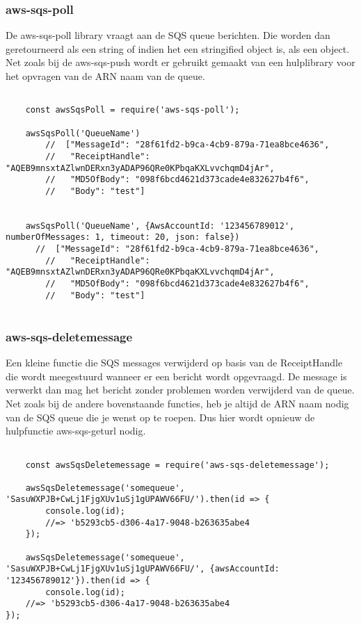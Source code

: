 \subsubsection{aws-sqs-poll}
De aws-sqs-poll library vraagt aan de SQS queue berichten. Die worden dan geretourneerd als een string of indien het een stringified object is, als een object. Net zoals bij de aws-sqs-push wordt er gebruikt gemaakt van een hulplibrary voor het opvragen van de ARN naam van de queue.

\begin{lstlisting}[caption=Voorbeeld hoe berichten worden opgehaald van de SQS queue]

	const awsSqsPoll = require('aws-sqs-poll');

	awsSqsPoll('QueueName')
    	//  ["MessageId": "28f61fd2-b9ca-4cb9-879a-71ea8bce4636",
    	//   "ReceiptHandle": "AQEB9mnsxtAZlwnDERxn3yADAP96QRe0KPbqaKXLvvchqmD4jAr",
    	//   "MD5OfBody": "098f6bcd4621d373cade4e832627b4f6",
    	//   "Body": "test"]


	awsSqsPoll('QueueName', {AwsAccountId: '123456789012', numberOfMessages: 1, timeout: 20, json: false})
  	  //  ["MessageId": "28f61fd2-b9ca-4cb9-879a-71ea8bce4636",
    	//   "ReceiptHandle": "AQEB9mnsxtAZlwnDERxn3yADAP96QRe0KPbqaKXLvvchqmD4jAr",
    	//   "MD5OfBody": "098f6bcd4621d373cade4e832627b4f6",
    	//   "Body": "test"]
	
\end{lstlisting}

\subsubsection{aws-sqs-deletemessage}
Een kleine functie die SQS messages verwijderd op basis van de ReceiptHandle die wordt meegestuurd wanneer er een bericht wordt opgevraagd. De message is verwerkt dan mag het bericht zonder problemen worden verwijderd van de queue. Net zoals bij de andere bovenstaande functies, heb je altijd de ARN naam nodig van de SQS queue die je wenst op te roepen. Dus hier wordt opnieuw de hulpfunctie aws-sqs-geturl nodig.

\begin{lstlisting}[caption=Voorbeeld hoe een bericht wordt verwijderd van SQS nadat het is verwerkt]

	const awsSqsDeletemessage = require('aws-sqs-deletemessage');

	awsSqsDeletemessage('somequeue', 'SasuWXPJB+CwLj1FjgXUv1uSj1gUPAWV66FU/').then(id => {
		console.log(id);
		//=> 'b5293cb5-d306-4a17-9048-b263635abe4
	});

	awsSqsDeletemessage('somequeue', 'SasuWXPJB+CwLj1FjgXUv1uSj1gUPAWV66FU/', {awsAccountId: '123456789012'}).then(id => {
		console.log(id);
	//=> 'b5293cb5-d306-4a17-9048-b263635abe4
});
	
\end{lstlisting}


